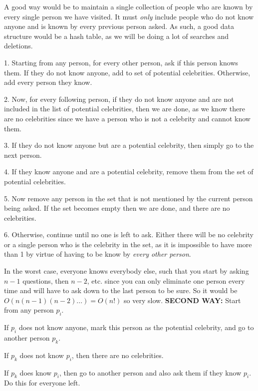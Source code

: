 \documentclass[11pt,letterpaper]{article}
\begin{document}
	A good way would be to maintain a single collection of people who are known by every single person we have visited. It must \textit{only} include people who do not know anyone and is known by every previous person asked.
	As such, a good data structure would be a hash table, as we will be doing a lot of searches and deletions.
	
	1. Starting from any person, for every other person, ask if this person knows them. If they do not know anyone, add to set of potential celebrities. Otherwise, add every person they know.
	
	2. Now, for every following person, if they do not know anyone and are not included in the list of potential celebrities, then we are done, as we know there are no celebrities since we have a person who is not a celebrity and cannot know them.
	
	3. If they do not know anyone but are a potential celebrity, then simply go to the next person.
	
	4. If they know anyone and are a potential celebrity, remove them from the set of potential celebrities.
	
	5. Now remove any person in the set that is not mentioned by the current person being asked. If the set becomes empty then we are done, and there are no celebrities.
	
	6. Otherwise, continue until no one is left to ask. Either there will be no celebrity or a single person who is the celebrity in the set, as it is impossible to have more than 1 by virtue of having to be know by \textit{every other person}.
	
	In the worst case, everyone knows everybody else, such that you start by asking $n-1$ questions, then $n-2$, etc. since you can only eliminate one person every time and will have to ask down to the last person to be sure. So it would be $O(n(n-1)(n-2)...)=O(n!)$ so very slow.
	\newline\newline
	\textbf{SECOND WAY:}\newline
	Start from any person $p_i$.
	
	If $p_i$ does not know anyone, mark this person as the potential celebrity, and go to another person $p_k$.
	
	If $p_k$ does not know $p_i$, then there are no celebrities.
	
	If $p_k$ does know $p_i$, then go to another person and also ask them if they know $p_i$. Do this for everyone left.
	
\end{document}
